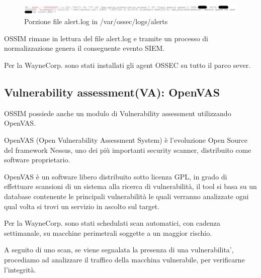          \begin{figure}[h]
            \begin{center}
                \includegraphics[width=0.98\columnwidth]{images/4_caso_d'uso_img/alertLog.png}
            \end{center}
            \caption{Porzione file alert.log in /var/ossec/logs/alerts}
            \label{fig:Porzione file alert.log in /var/ossec/logs/alerts}
        \end{figure}
             
             

OSSIM rimane in lettura del file alert.log e tramite un processo di normalizzazione genera il conseguente evento SIEM.\par
Per la WayneCorp. sono stati installati gli agent OSSEC su tutto il parco sever.

\subsection{Vulnerability assessment(VA): OpenVAS}

OSSIM possiede anche un modulo di Vulnerability assessment utilizzando OpenVAS.\par

OpenVAS (Open Vulnerability Assessment System) è l’evoluzione Open Source del framework Nessus, uno dei più importanti security scanner, distribuito come software proprietario.\par
OpenVAS è un software libero distribuito sotto licenza GPL, in grado di effettuare scansioni di un sistema alla ricerca di vulnerabilità, il tool si basa su un database contenente le principali vulnerabilità le quali verranno analizzate ogni qual volta si trovi un servizio in ascolto sul target.\par
Per la WayneCorp. sono stati schedulati scan automatici, con cadenza settimanale, su macchine perimetrali soggette a un maggior rischio.\par
A seguito di uno scan, se viene segnalata la presenza di una  vulnerabilita’, procediamo ad analizzare il traffico della macchina vulnerabile, per verificarne l'integrità.

